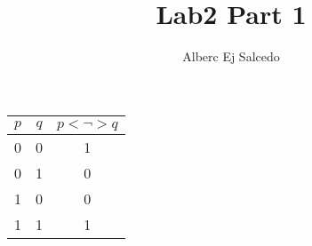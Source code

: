 \documentclass[11pt]{article}
\title{Lab2 Part 1}
\author{Alberc Ej Salcedo}
\begin{document}
\maketitle

\begin{tabular}{|c|c|c|}
\hline
$p$ & $q$ & $p < \lnot > q$ \\
\hline
0 & 0 & 1 \\
0 & 1 & 0 \\
1 & 0 & 0 \\
1 & 1 & 1 \\
\hline
\end{tabular}
\end{document}
